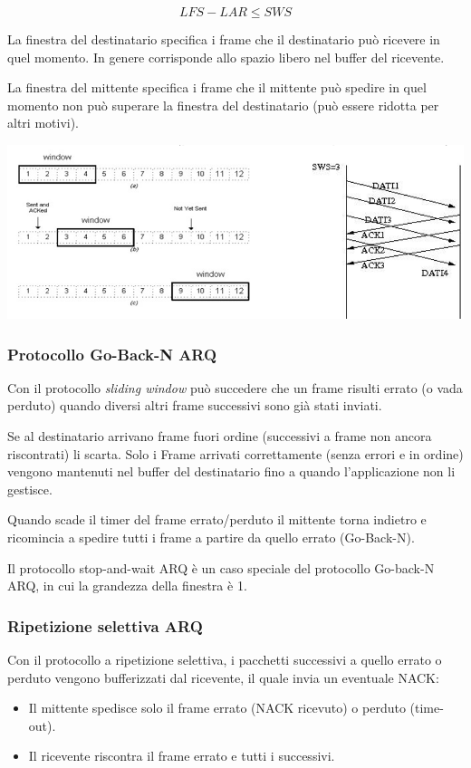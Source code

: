             \begin{equation*}
                LFS - LAR \leq SWS
            \end{equation*}

            La finestra del destinatario specifica i frame che il destinatario può ricevere in quel momento. In genere corrisponde allo spazio libero nel buffer del ricevente.

            La finestra del mittente specifica i frame che il mittente può spedire in quel momento non può superare la finestra del destinatario (può essere ridotta per altri motivi).

            \begin{center}
                \includegraphics[scale=0.38]{chapters/3/assets/schema_j.png}
            \end{center}

        \subsubsection{Protocollo Go-Back-N ARQ}
            Con il protocollo \textit{sliding window} può succedere che un frame risulti errato (o vada perduto) quando diversi altri frame successivi sono già stati inviati.
        
            Se al destinatario arrivano frame fuori ordine (successivi a frame non ancora riscontrati) li scarta. Solo i Frame arrivati correttamente (senza errori e in ordine) vengono mantenuti nel buffer del destinatario fino a quando l'applicazione non li gestisce.
        
            Quando scade il timer del frame errato/perduto il mittente torna indietro e ricomincia a spedire tutti i frame a partire da quello errato (Go-Back-N).

            Il protocollo stop-and-wait ARQ è un caso speciale del protocollo Go-back-N ARQ, in cui la grandezza della finestra è 1.

        \subsubsection{Ripetizione selettiva ARQ}
            Con il protocollo a ripetizione selettiva, i pacchetti successivi a quello errato o perduto vengono bufferizzati dal ricevente, il quale invia un eventuale NACK:
            \begin{itemize}
                \item Il mittente spedisce solo il frame errato (NACK ricevuto) o perduto (time-out).
                \item Il ricevente riscontra il frame errato e tutti i successivi.
            \end{itemize}

